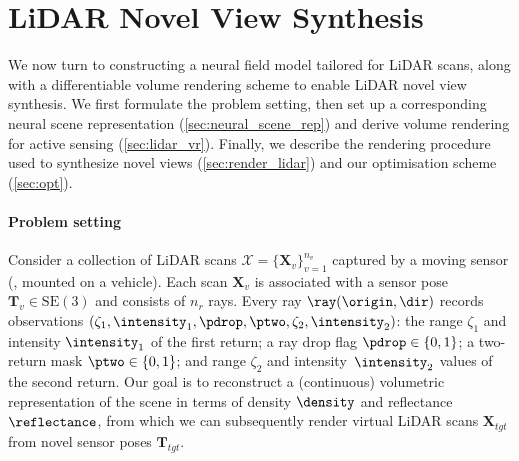 \section{LiDAR Novel View Synthesis}
\label{sec:method}

We now turn to constructing a neural field model tailored for LiDAR scans, along with a differentiable volume rendering scheme to enable LiDAR novel view synthesis.
We first formulate the problem setting, then set up a corresponding neural scene representation (\cref{sec:neural_scene_rep}) and derive volume rendering for active sensing (\cref{sec:lidar_vr}). Finally, we describe the rendering procedure used to synthesize novel views (\cref{sec:render_lidar}) and our optimisation scheme (\cref{sec:opt}). 


\paragraph{Problem setting}
Consider a collection of LiDAR scans $\mathcal{X} = \{\mathbf{X}_v\}_{v=1}^{n_v}$ captured by a moving sensor (\eg, mounted on a vehicle). Each scan $\mathbf{X}_v$ is associated with a sensor pose $\mathbf{T}_v \in \text{SE}(3)$ and consists of $n_r$ rays. Every ray $\ray(\origin, \dir)$ records observations $(\zeta_1, \intensity_1, \pdrop, \ptwo, \zeta_2, \intensity_2)$: the range $\zeta_1$ and intensity $\intensity_1$ of the first return; a ray drop flag $\pdrop \in \{0, 1\}$; a two-return mask $\ptwo \in \{0,1\}$; and range $\zeta_2$ and intensity~$\intensity_2$ values of the second return.
Our goal is to reconstruct a (continuous) volumetric representation of the scene in terms of density $\density$ and reflectance $\reflectance$, from which we can subsequently render virtual LiDAR scans $\mathbf{X}_{tgt}$ from novel sensor poses $\mathbf{T}_{tgt}$.

